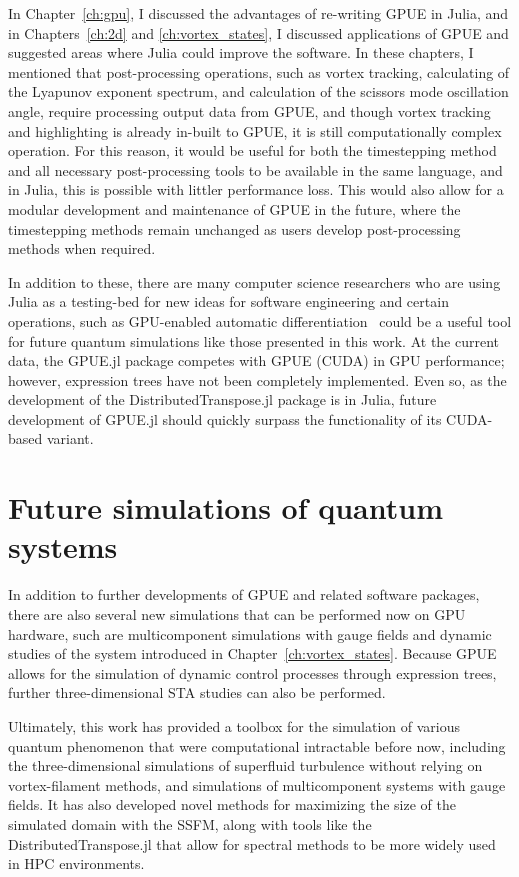 In Chapter~\ref{ch:gpu}, I discussed the advantages of re-writing GPUE in Julia, and in Chapters~\ref{ch:2d} and \ref{ch:vortex_states}, I discussed applications of GPUE and suggested areas where Julia could improve the software.
In these chapters, I mentioned that post-processing operations, such as vortex tracking, calculating of the Lyapunov exponent spectrum, and calculation of the scissors mode oscillation angle, require processing output data from GPUE, and though vortex tracking and highlighting is already in-built to GPUE, it is still computationally complex operation.
For this reason, it would be useful for both the timestepping method and all necessary post-processing tools to be available in the same language, and in Julia, this is possible with littler performance loss.
This would also allow for a modular development and maintenance of GPUE in the future, where the timestepping methods remain unchanged as users develop post-processing methods when required.

In addition to these, there are many computer science researchers who are using Julia as a testing-bed for new ideas for software engineering and certain operations, such as GPU-enabled automatic differentiation~\cite{revels2018} could be a useful tool for future quantum simulations like those presented in this work.
At the current data, the GPUE.jl package competes with GPUE (CUDA) in GPU performance; however, expression trees have not been completely implemented.
Even so, as the development of the DistributedTranspose.jl package is in Julia, future development of GPUE.jl should quickly surpass the functionality of its CUDA-based variant.

\section{Future simulations of quantum systems}

In addition to further developments of GPUE and related software packages, there are also several new simulations that can be performed now on GPU hardware, such are multicomponent simulations with gauge fields and dynamic studies of the system introduced in Chapter~\ref{ch:vortex_states}.
Because GPUE allows for the simulation of dynamic control processes through expression trees, further three-dimensional STA studies can also be performed.

Ultimately, this work has provided a toolbox for the simulation of various quantum phenomenon that were computational intractable before now, including the three-dimensional simulations of superfluid turbulence without relying on vortex-filament methods, and simulations of multicomponent systems with gauge fields.
It has also developed novel methods for maximizing the size of the simulated domain with the SSFM, along with tools like the DistributedTranspose.jl that allow for spectral methods to be more widely used in HPC environments.

